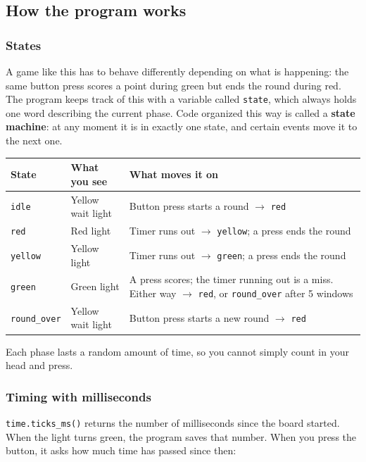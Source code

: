 \subsection{How the program works}

\subsubsection{States}
A game like this has to behave differently depending on what is happening: the same button press
scores a point during green but ends the round during red. The program keeps track of this with a
variable called \texttt{state}, which always holds one word describing the current phase. Code
organized this way is called a \textbf{state machine}: at any moment it is in exactly one state, and
certain events move it to the next one.

\begin{center}
\begin{tabular}{|l|>{\raggedright\arraybackslash}p{5.2cm}|>{\raggedright\arraybackslash}p{6.4cm}|}
    \hline
    \textbf{State} & \textbf{What you see} & \textbf{What moves it on} \\
    \hline
    \texttt{idle}       & Yellow wait light & Button press starts a round $\rightarrow$ \texttt{red} \\
    \texttt{red}        & Red light         & Timer runs out $\rightarrow$ \texttt{yellow}; a press ends the round \\
    \texttt{yellow}     & Yellow light      & Timer runs out $\rightarrow$ \texttt{green}; a press ends the round \\
    \texttt{green}      & Green light       & A press scores; the timer running out is a miss. Either way $\rightarrow$ \texttt{red}, or \texttt{round\_over} after 5 windows \\
    \texttt{round\_over} & Yellow wait light & Button press starts a new round $\rightarrow$ \texttt{red} \\
    \hline
\end{tabular}
\end{center}

Each phase lasts a random amount of time, so you cannot simply count in your head and press.

\subsubsection{Timing with milliseconds}
\texttt{time.ticks\_ms()} returns the number of milliseconds since the board started. When the
light turns green, the program saves that number. When you press the button, it asks how much time
has passed since then:

